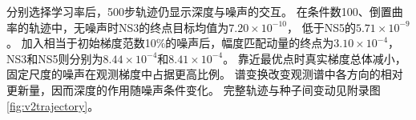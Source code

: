 分别选择学习率后，500步轨迹仍显示深度与噪声的交互。
在条件数100、倒置曲率的轨迹中，无噪声时NS3的终点目标均值为$7.20\times10^{-10}$，
低于NS5的$5.71\times10^{-9}$。
加入相当于初始梯度范数10\%的噪声后，幅度匹配动量的终点为$3.10\times10^{-4}$，
NS3和NS5则分别为$8.44\times10^{-4}$和$8.41\times10^{-4}$。
靠近最优点时真实梯度总体减小，固定尺度的噪声在观测梯度中占据更高比例。
谱变换改变观测谱中各方向的相对更新量，因而深度的作用随噪声条件变化。
完整轨迹与种子间变动见附录图\ref{fig:v2trajectory}。


